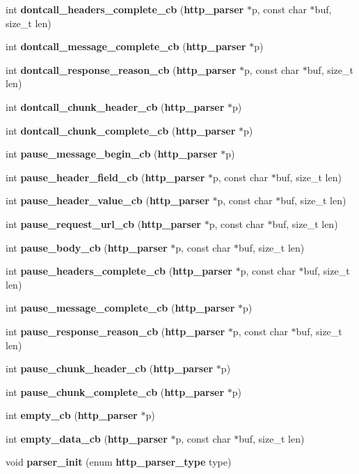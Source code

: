 \begin{DoxyCompactItemize}
int {\bf dontcall\+\_\+headers\+\_\+complete\+\_\+cb} ({\bf http\+\_\+parser} $\ast$p, const char $\ast$buf, size\+\_\+t len)
\item 
int {\bf dontcall\+\_\+message\+\_\+complete\+\_\+cb} ({\bf http\+\_\+parser} $\ast$p)
\item 
int {\bf dontcall\+\_\+response\+\_\+reason\+\_\+cb} ({\bf http\+\_\+parser} $\ast$p, const char $\ast$buf, size\+\_\+t len)
\item 
int {\bf dontcall\+\_\+chunk\+\_\+header\+\_\+cb} ({\bf http\+\_\+parser} $\ast$p)
\item 
int {\bf dontcall\+\_\+chunk\+\_\+complete\+\_\+cb} ({\bf http\+\_\+parser} $\ast$p)
\item 
int {\bf pause\+\_\+message\+\_\+begin\+\_\+cb} ({\bf http\+\_\+parser} $\ast$p)
\item 
int {\bf pause\+\_\+header\+\_\+field\+\_\+cb} ({\bf http\+\_\+parser} $\ast$p, const char $\ast$buf, size\+\_\+t len)
\item 
int {\bf pause\+\_\+header\+\_\+value\+\_\+cb} ({\bf http\+\_\+parser} $\ast$p, const char $\ast$buf, size\+\_\+t len)
\item 
int {\bf pause\+\_\+request\+\_\+url\+\_\+cb} ({\bf http\+\_\+parser} $\ast$p, const char $\ast$buf, size\+\_\+t len)
\item 
int {\bf pause\+\_\+body\+\_\+cb} ({\bf http\+\_\+parser} $\ast$p, const char $\ast$buf, size\+\_\+t len)
\item 
int {\bf pause\+\_\+headers\+\_\+complete\+\_\+cb} ({\bf http\+\_\+parser} $\ast$p, const char $\ast$buf, size\+\_\+t len)
\item 
int {\bf pause\+\_\+message\+\_\+complete\+\_\+cb} ({\bf http\+\_\+parser} $\ast$p)
\item 
int {\bf pause\+\_\+response\+\_\+reason\+\_\+cb} ({\bf http\+\_\+parser} $\ast$p, const char $\ast$buf, size\+\_\+t len)
\item 
int {\bf pause\+\_\+chunk\+\_\+header\+\_\+cb} ({\bf http\+\_\+parser} $\ast$p)
\item 
int {\bf pause\+\_\+chunk\+\_\+complete\+\_\+cb} ({\bf http\+\_\+parser} $\ast$p)
\item 
int {\bf empty\+\_\+cb} ({\bf http\+\_\+parser} $\ast$p)
\item 
int {\bf empty\+\_\+data\+\_\+cb} ({\bf http\+\_\+parser} $\ast$p, const char $\ast$buf, size\+\_\+t len)
\item 
void {\bf parser\+\_\+init} (enum {\bf http\+\_\+parser\+\_\+type} type)
\item 

\end{DoxyCompactItemize}

